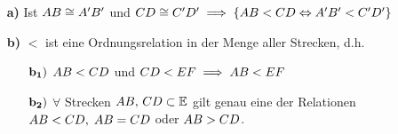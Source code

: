 \begin{thm}\label{thm:satz.s1g}
\begin{enumerate}
    \item[{\bf a)}] Ist ${AB}\cong{A'B'}$ und ${CD}\cong{C'D'}\;
        \Longrightarrow\;\{{AB}<{CD}\Leftrightarrow{A'B'}<{C'D'}\}$
    \item[{\bf b)}] \glqq{}$<$\grqq{} ist eine Ordnungsrelation in der Menge aller
    Strecken, d.h.
    \begin{enumerate}
    \item[${\bf b_1)}$] ${AB}<{CD}$ und ${CD}<{EF}\;\Longrightarrow
        \;{AB}<{EF}$
    \item[${\bf b_2)}$] $\forall$ Strecken
    ${AB},\,{CD}\subset\mathbb E$ gilt genau eine der
    Relationen \\ ${AB}<{CD},\;{AB}={CD}$ oder
    ${AB}>{CD}$.
    \end{enumerate}
\end{enumerate}
\end{thm}



